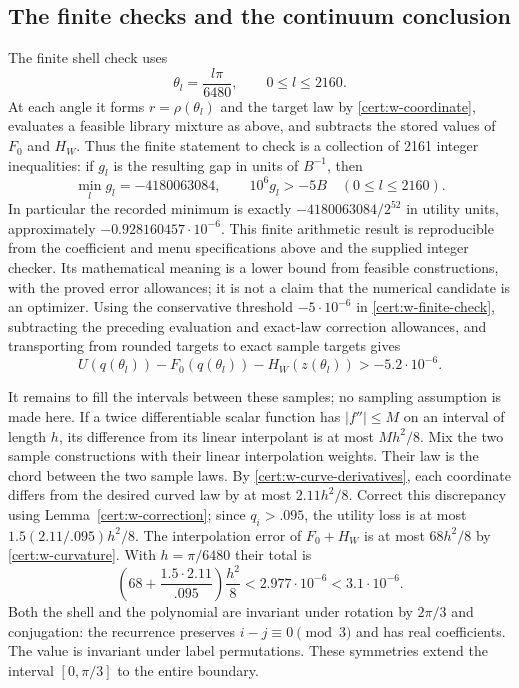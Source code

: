 \documentclass[11pt]{article}
\numberwithin{equation}{section}
\theoremstyle{definition}
\theoremstyle{remark}
\begin{document}
\subsection{The finite checks and the continuum conclusion}

The finite shell check uses
\begin{equation}
 \theta_l=\frac{l\pi}{6480},\qquad 0\le l\le2160.
 \label{cert:w-samples}
\end{equation}
At each angle it forms $r=\rho(\theta_l)$ and the target law by
\eqref{cert:w-coordinate}, evaluates a feasible library mixture as
above, and subtracts the stored values of $F_0$ and $H_W$.  Thus the
finite statement to check is a collection of 2161 integer inequalities:
if $g_l$ is the resulting gap in units of $B^{-1}$, then
\begin{equation}
 \min_l g_l=-4180063084,
 \qquad 10^6 g_l>-5B\quad(0\le l\le2160).
 \label{cert:w-finite-check}
\end{equation}
In particular the recorded minimum is exactly
$-4180063084/2^{52}$ in utility units, approximately
$-0.928160457\cdot10^{-6}$.  This finite arithmetic result is
reproducible from the coefficient and menu specifications above and the
supplied integer checker.  Its mathematical meaning is a lower bound
from feasible constructions, with the proved error allowances; it is
not a claim that the numerical candidate is an optimizer.
Using the conservative threshold $-5\cdot10^{-6}$ in
\eqref{cert:w-finite-check}, subtracting the preceding evaluation and
exact-law correction allowances, and transporting from rounded targets
to exact sample targets gives
\begin{equation}
 U(q(\theta_l))-F_0(q(\theta_l))-H_W(z(\theta_l))
       >-5.2\cdot10^{-6}.
 \label{cert:w-sample-bound}
\end{equation}

It remains to fill the intervals between these samples; no sampling
assumption is made here.  If a twice differentiable scalar function
has $|f''|\le M$ on an interval of length $h$, its difference from its
linear interpolant is at most $Mh^2/8$.  Mix the two sample
constructions with their linear interpolation weights.  Their law is
the chord between the two sample laws.  By
\eqref{cert:w-curve-derivatives}, each coordinate differs from the
desired curved law by at most $2.11h^2/8$.  Correct this discrepancy
using Lemma~\ref{cert:w-correction}; since $q_i>.095$, the utility
loss is at most $1.5(2.11/.095)h^2/8$.  The interpolation error of
$F_0+H_W$ is at most $68h^2/8$ by \eqref{cert:w-curvature}.
With $h=\pi/6480$ their total is
\begin{equation}
 \left(68+\frac{1.5\cdot2.11}{.095}\right)\frac{h^2}{8}
 <2.977\cdot10^{-6}<3.1\cdot10^{-6}.
 \label{cert:w-interpolation}
\end{equation}
Both the shell and the polynomial are invariant under rotation by
$2\pi/3$ and conjugation: the recurrence preserves $i-j\equiv0\pmod3$
and has real coefficients.  The value is invariant under label
permutations.  These symmetries extend the interval $[0,\pi/3]$ to the
entire boundary.
\end{document}
